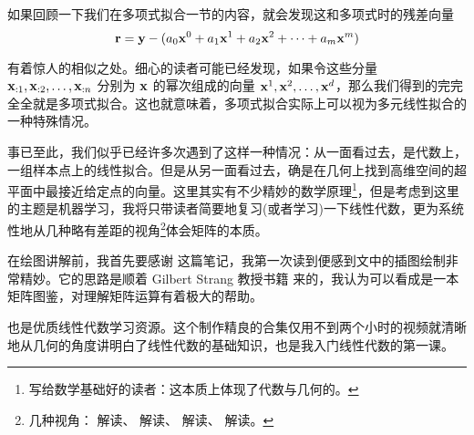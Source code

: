 如果回顾一下我们在多项式拟合一节的内容，就会发现这和多项式时的残差向量
\[
    {\mathbf{r}} = {\mathbf{y}} - (a_0 {\mathbf{x}}^0 + a_1 {\mathbf{x}}^1 + a_2 {\mathbf{x}}^2 + \cdots + a_{m} {\mathbf{x}}^{m})
\]

有着惊人的相似之处。细心的读者可能已经发现，如果令这些分量 ${\mathbf{x}}_{:1}, {\mathbf{x}}_{:2}, \ldots, {\mathbf{x}}_{:n}$ 分别为 ${\mathbf{x}}$ 的幂次组成的向量 ${\mathbf{x}}^1, {\mathbf{x}}^2, \ldots, {\mathbf{x}}^d$，那么我们得到的完完全全就是多项式拟合。这也就意味着，多项式拟合实际上可以视为多元线性拟合的一种特殊情况。

事已至此，我们似乎已经许多次遇到了这样一种情况：从一面看过去，是代数上，一组样本点上的线性拟合。但是从另一面看过去，确是在几何上找到高维空间的超平面中最接近给定点的向量。这里其实有不少精妙的数学原理\footnote{写给数学基础好的读者：这本质上体现了代数与几何的。}，但是考虑到这里的主题是机器学习，我将只带读者简要地复习(或者学习)一下线性代数，更为系统性地从几种略有差距的视角\footnote{
    几种视角：
    解读、
    解读、
    解读、
    解读。
}体会矩阵的本质。

在绘图讲解前，我首先要感谢 这篇笔记，我第一次读到便感到文中的插图绘制非常精妙。它的思路是顺着 Gilbert Strang 教授书籍 来的，我认为可以看成是一本矩阵图鉴，对理解矩阵运算有着极大的帮助。

也是优质线性代数学习资源。这个制作精良的合集仅用不到两个小时的视频就清晰地从几何的角度讲明白了线性代数的基础知识，也是我入门线性代数的第一课。


